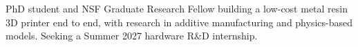 PhD student and NSF Graduate Research Fellow building a low-cost metal resin 3D printer end to end, with research in additive manufacturing and physics-based models. Seeking a Summer 2027 hardware R\&D internship.
